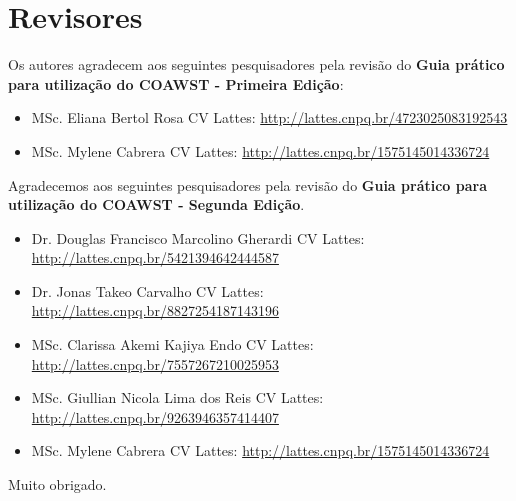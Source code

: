 
\chapter*{Revisores}

\bigskip
\noindent Os autores agradecem aos seguintes pesquisadores pela revisão do \textbf{Guia prático para utilização do COAWST - Primeira Edição}:
\bigskip

\begin{itemize}
    \item MSc. Eliana Bertol Rosa \newline CV Lattes: \textcolor{bleu_cite}{\href{http://lattes.cnpq.br/4723025083192543}{http://lattes.cnpq.br/4723025083192543}}
    \bigskip
    \item MSc. Mylene Cabrera \newline CV Lattes: \textcolor{bleu_cite}{\href{http://lattes.cnpq.br/1575145014336724}{http://lattes.cnpq.br/1575145014336724}}
\end{itemize}

\bigskip
\bigskip
\noindent Agradecemos aos seguintes pesquisadores pela revisão do \textbf{Guia prático para utilização do COAWST - Segunda Edição}.
\bigskip

\begin{itemize}
    \item Dr. Douglas Francisco Marcolino Gherardi \newline CV Lattes: \textcolor{bleu_cite}{\href{http://lattes.cnpq.br/5421394642444587}{http://lattes.cnpq.br/5421394642444587}}
    \bigskip
    \item Dr. Jonas Takeo Carvalho \newline CV Lattes: \textcolor{bleu_cite}{\href{http://lattes.cnpq.br/8827254187143196}{http://lattes.cnpq.br/8827254187143196}}
    \bigskip
    \item MSc. Clarissa Akemi Kajiya Endo \newline CV Lattes: \textcolor{bleu_cite}{\href{http://lattes.cnpq.br/7557267210025953}{http://lattes.cnpq.br/7557267210025953}}
    \bigskip
    \item MSc. Giullian Nicola Lima dos Reis \newline CV Lattes: \textcolor{bleu_cite}{\href{http://lattes.cnpq.br/9263946357414407}{http://lattes.cnpq.br/9263946357414407}}
    \bigskip
    \item MSc. Mylene Cabrera \newline CV Lattes: \textcolor{bleu_cite}{\href{http://lattes.cnpq.br/1575145014336724}{http://lattes.cnpq.br/1575145014336724}}
\end{itemize}

\begin{flushright}
    Muito obrigado. \\
\end{flushright}